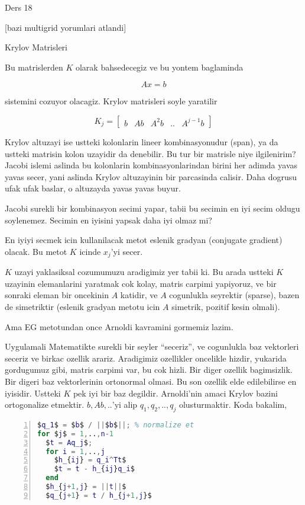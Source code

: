 \documentclass[12pt,fleqn]{article}\usepackage{../common}
\begin{document}
Ders 18

[bazi multigrid yorumlari atlandi]

Krylov Matrisleri 

Bu matrislerden $K$ olarak bahsedecegiz ve bu yontem baglaminda 

\[ Ax = b \]

sistemini cozuyor olacagiz. Krylov matrisleri soyle yaratilir

\[ K_j = \left[\begin{array}{rrrrr}
b & Ab & A^2b & .. & A^{j-1}b
\end{array}\right] \]

Krylov altuzayi ise ustteki kolonlarin lineer kombinasyonudur (span), ya da
ustteki matrisin kolon uzayidir da denebilir. Bu tur bir matrisle niye
ilgilenirim? Jacobi islemi aslinda bu kolonlarin kombinasyonlarindan birini
her adimda yavas yavas secer, yani aslinda Krylov altuzayinin bir
parcasinda calisir. Daha dogrusu ufak ufak baslar, o altuzayda yavas yavas
buyur.

Jacobi surekli bir kombinasyon secimi yapar, tabii bu secimin en iyi secim
oldugu soylenemez. Secimin en iyisini yapsak daha iyi olmaz mi? 

En iyiyi secmek icin kullanilacak metot eslenik gradyan (conjugate
gradient) olacak. Bu metot $K$ icinde $x_j$'yi secer. 

$K$ uzayi yaklasiksal cozumumuzu aradigimiz yer tabii ki. Bu arada ustteki
$K$ uzayinin elemanlarini yaratmak cok kolay, matris carpimi yapiyoruz, ve
bir sonraki eleman bir oncekinin $A$ katidir, ve $A$ cogunlukla seyrektir
(sparse), bazen de simetriktir (eslenik gradyan metotu icin $A$ simetrik,
pozitif kesin olmali).

Ama EG metotundan once Arnoldi kavramini gormemiz lazim. 

Uygulamali Matematikte surekli bir seyler ``seceriz'', ve cogunlukla baz
vektorleri seceriz ve birkac ozellik arariz. Aradigimiz ozellikler
oncelikle hizdir, yukarida gordugumuz gibi, matris carpimi var, bu cok
hizli. Bir diger ozellik bagimsizlik. Bir digeri baz vektorlerinin
ortonormal olmasi. Bu son ozellik elde edilebilirse en iyisidir. Ustteki
$K$ pek iyi bir baz degildir. Arnoldi'nin amaci Krylov bazini ortogonalize
etmektir. $b,Ab,..$'yi alip $q_1,q_2,..,q_j$ olusturmaktir. Koda bakalim, 

\begin{lstlisting}[language=Matlab,mathescape,numbers=left]
$q_1$ = $b$ / ||$b$||; % normalize et
for $j$ = 1,..,n-1
  $t = Aq_j$;
  for i = 1,..,j
    $h_{ij} = q_i^Tt$
    $t = t - h_{ij}q_i$
  end
  $h_{j+1,j} = ||t||$
  $q_{j+1} = t / h_{j+1,j}$    
\end{lstlisting}
\end{document}

